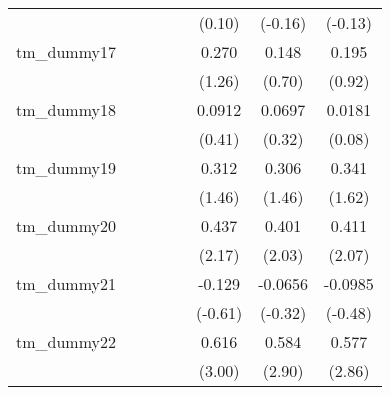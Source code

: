 {\begin{tabular}{l*{7}{c}}
            &                     &                     &                     &                     &      (0.10)         &     (-0.16)         &     (-0.13)         \\
[1em]
tm\_dummy17  &                     &                     &                     &                     &       0.270         &       0.148         &       0.195         \\
            &                     &                     &                     &                     &      (1.26)         &      (0.70)         &      (0.92)         \\
[1em]
tm\_dummy18  &                     &                     &                     &                     &      0.0912         &      0.0697         &      0.0181         \\
            &                     &                     &                     &                     &      (0.41)         &      (0.32)         &      (0.08)         \\
[1em]
tm\_dummy19  &                     &                     &                     &                     &       0.312         &       0.306         &       0.341         \\
            &                     &                     &                     &                     &      (1.46)         &      (1.46)         &      (1.62)         \\
[1em]
tm\_dummy20  &                     &                     &                     &                     &       0.437\sym{*}  &       0.401\sym{*}  &       0.411\sym{*}  \\
            &                     &                     &                     &                     &      (2.17)         &      (2.03)         &      (2.07)         \\
[1em]
tm\_dummy21  &                     &                     &                     &                     &      -0.129         &     -0.0656         &     -0.0985         \\
            &                     &                     &                     &                     &     (-0.61)         &     (-0.32)         &     (-0.48)         \\
[1em]
tm\_dummy22  &                     &                     &                     &                     &       0.616\sym{**} &       0.584\sym{**} &       0.577\sym{**} \\
            &                     &                     &                     &                     &      (3.00)         &      (2.90)         &      (2.86)         \\

\end{tabular}}
